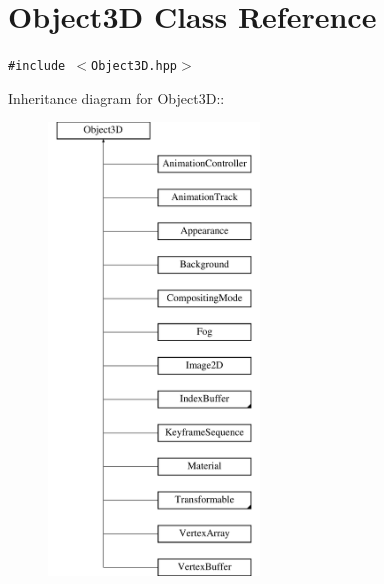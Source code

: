 \hypertarget{classm3g_1_1Object3D}{
\section{Object3D Class Reference}
\label{classm3g_1_1Object3D}
}
{\tt \#include $<$Object3D.hpp$>$}

Inheritance diagram for Object3D::\begin{figure}[H]
\begin{center}
\leavevmode
\includegraphics[height=12cm]{classm3g_1_1Object3D}
\end{center}
\end{figure}
